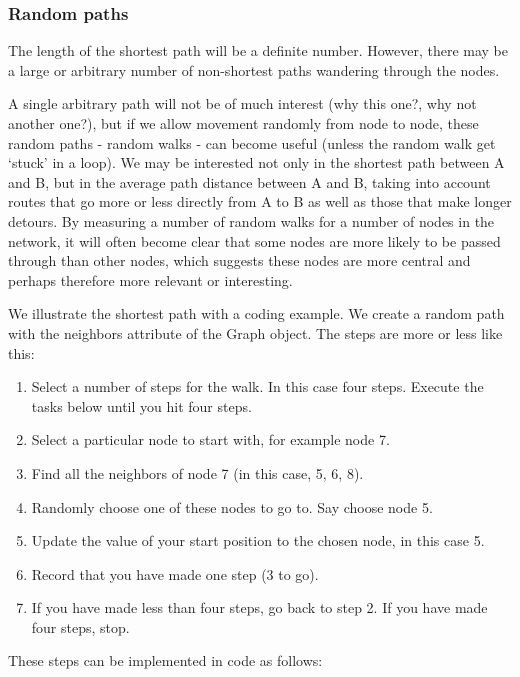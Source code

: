     \hypertarget{random-paths}{%
\subsubsection{Random paths}\label{random-paths}}

The length of the shortest path will be a definite number. However,
there may be a large or arbitrary number of non-shortest paths wandering
through the nodes.

A single arbitrary path will not be of much interest (why this one?, why
not another one?), but if we allow movement randomly from node to node,
these random paths - random walks - can become useful (unless the random
walk get `stuck' in a loop). We may be interested not only in the
shortest path between A and B, but in the average path distance between
A and B, taking into account routes that go more or less directly from A
to B as well as those that make longer detours. By measuring a number of
random walks for a number of nodes in the network, it will often become
clear that some nodes are more likely to be passed through than other
nodes, which suggests these nodes are more central and perhaps therefore
more relevant or interesting.

    We illustrate the shortest path with a coding example. We create a
random path with the neighbors attribute of the Graph object. The steps
are more or less like this:

\begin{enumerate}
\def\labelenumi{\arabic{enumi}.}
\tightlist
\item
  Select a number of steps for the walk. In this case four steps.
  Execute the tasks below until you hit four steps.
\item
  Select a particular node to start with, for example node 7.
\item
  Find all the neighbors of node 7 (in this case, 5, 6, 8).
\item
  Randomly choose one of these nodes to go to. Say choose node 5.
\item
  Update the value of your start position to the chosen node, in this
  case 5.
\item
  Record that you have made one step (3 to go).
\item
  If you have made less than four steps, go back to step 2. If you have
  made four steps, stop.
\end{enumerate}

These steps can be implemented in code as follows:

